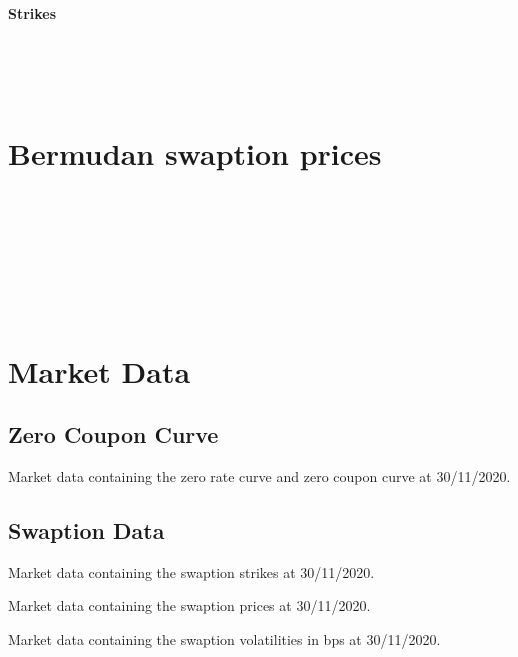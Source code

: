 \paragraph*{Strikes}\hfill\\
\noindent
	
\begin{table}
\centering
	\bSwaptionStrikesB\hfill\\
\caption{\bSwaptionStrikesCaptionB}
\end{table}
\FloatBarrier
\section{Bermudan swaption prices}
	
\begin{table}
\centering
	\cmsCIRBOne\hfill\\
\caption{\cmsCIRCaptionBOne}
\end{table}
\begin{table}
\centering
	\cmsCIRBTwo\hfill\\
\caption{\cmsCIRCaptionBTwo}
\end{table}
\begin{table}
\centering
	\cmsCIRBThree\hfill\\
\caption{\cmsCIRCaptionBThree}
\end{table}
\begin{table}
\centering
	\cmsCIRBFour\hfill\\
\caption{\cmsCIRCaptionBFour}
\end{table}
\FloatBarrier
\appendix
\section{Market Data}
\subsection{Zero Coupon Curve}
	
\begin{table}
	\marketDataB
\centering
\caption{Market data containing the zero rate curve and zero coupon curve at 30/11/2020.}
\label{tab:market_dataB}
\end{table}
\subsection{Swaption Data}
	
\begin{table}
	\strikeSwaptionB
\centering
\caption{Market data containing the swaption strikes at 30/11/2020.}
\label{tab:strike_swaptionB}
\end{table}
	
\begin{table}
	\marketSwaptionB
\centering
\caption{Market data containing the swaption prices at 30/11/2020.}
\label{tab:market_swaptionB}
\end{table}
	
\begin{table}
	\volSwaptionB
\centering
\caption{Market data containing the swaption volatilities in bps at 30/11/2020.}
\label{tab:market_swaptionB}
\end{table}
